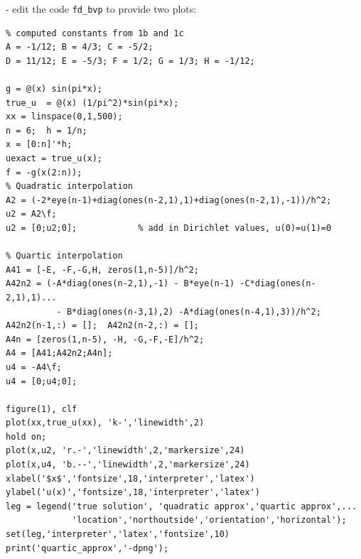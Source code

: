 \documentclass[14pt,a4paper]{article}
\begin{document}
\begin{enumerate}
	
	- edit the code \texttt{fd\_bvp} to provide two plots: 
	\begin{lstlisting}
% computed constants from 1b and 1c
A = -1/12; B = 4/3; C = -5/2;
D = 11/12; E = -5/3; F = 1/2; G = 1/3; H = -1/12;

g = @(x) sin(pi*x);
true_u  = @(x) (1/pi^2)*sin(pi*x);
xx = linspace(0,1,500);
n = 6;	h = 1/n;
x = [0:n]'*h;
uexact = true_u(x);
f = -g(x(2:n));
% Quadratic interpolation
A2 = (-2*eye(n-1)+diag(ones(n-2,1),1)+diag(ones(n-2,1),-1))/h^2;
u2 = A2\f;
u2 = [0;u2;0];            % add in Dirichlet values, u(0)=u(1)=0

% Quartic interpolation
A41 = [-E, -F,-G,H, zeros(1,n-5)]/h^2;
A42n2 = (-A*diag(ones(n-2,1),-1) - B*eye(n-1) -C*diag(ones(n-2,1),1)...
          - B*diag(ones(n-3,1),2) -A*diag(ones(n-4,1),3))/h^2;
A42n2(n-1,:) = [];	A42n2(n-2,:) = [];
A4n = [zeros(1,n-5), -H, -G,-F,-E]/h^2;
A4 = [A41;A42n2;A4n];
u4 = -A4\f;
u4 = [0;u4;0];

figure(1), clf
plot(xx,true_u(xx), 'k-','linewidth',2)
hold on;
plot(x,u2, 'r.-','linewidth',2,'markersize',24)
plot(x,u4, 'b.--','linewidth',2,'markersize',24)
xlabel('$x$','fontsize',18,'interpreter','latex')
ylabel('u(x)','fontsize',18,'interpreter','latex')
leg = legend('true solution', 'quadratic approx','quartic approx',...
             'location','northoutside','orientation','horizontal');
set(leg,'interpreter','latex','fontsize',10)
print('quartic_approx','-dpng');


\end{lstlisting}
\end{enumerate}
\end{document}
